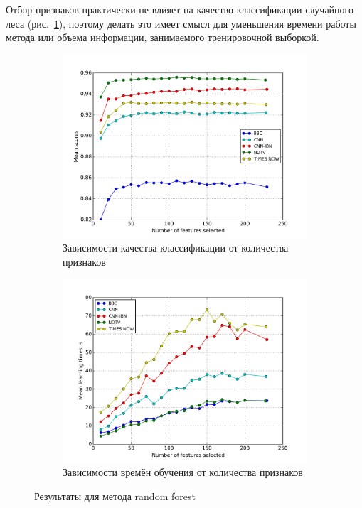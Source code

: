 \par
Отбор признаков практически не влияет на качество классификации случайного леса (рис.~\ref{fig:randfor_rfs}), поэтому делать это имеет  смысл для уменьшения времени работы метода или объема информации, занимаемого тренировочной выборкой.

\begin{figure}[h!]
    \centering
	\begin{subfigure}{0.45\textwidth}
		\includegraphics[width=\textwidth]{images/RFS-randforest.png}
		\caption{Зависимости качества классификации от количества признаков}
	\end{subfigure}
	\begin{subfigure}{0.45\textwidth}
		\includegraphics[width=\textwidth]{images/RFS-randforestTime.png}
		\caption{Зависимости времён обучения от количества признаков}
	\end{subfigure}
	\caption{Результаты для метода random forest}\label{fig:randfor_rfs}
\end{figure} 

